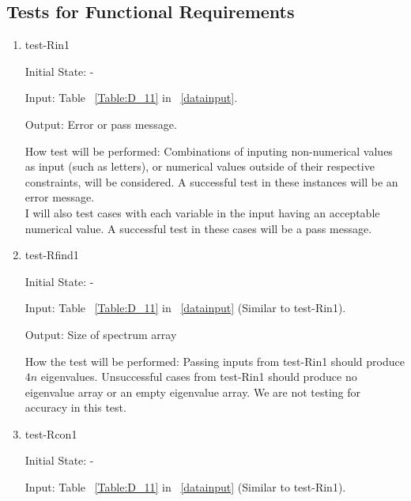 \documentclass[12pt, titlepage]{article}
\begin{document}
\subsection{Tests for Functional Requirements}
\label{FRtests}
\begin{enumerate}
\item{test-Rin1\\}	
				
Initial State: -
					
Input: Table ~\ref{Table:D_11} in ~\ref{datainput}.
					
Output: Error or pass message. 
					
How test will be performed: Combinations of inputing non-numerical values as 
input  (such as letters), or numerical values outside of their respective 
constraints, will be considered. A successful test in these instances will be 
an error message. \\
I will also test cases with each variable in the input having an 
acceptable numerical value. A successful test in these cases will be a pass 
message. 
					
\item{test-Rfind1} 

Initial State: - 

Input: Table ~\ref{Table:D_11} in ~\ref{datainput} (Similar to test-Rin1).

Output: Size of spectrum array 

How the test will be performed: Passing inputs from test-Rin1 should produce 
$4n$ eigenvalues. Unsuccessful cases 
from test-Rin1 should produce no eigenvalue array 
or an empty eigenvalue array. We are not testing for accuracy in this test.

\item{test-Rcon1} 

Initial State: -

Input: Table ~\ref{Table:D_11} in ~\ref{datainput} (Similar to test-Rin1).


\end{enumerate}
\end{document}
